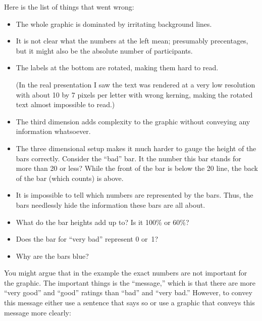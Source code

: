 Here is the list of things that went wrong:
\begin{itemize}
\item
  The whole graphic is dominated by irritating background lines.
\item
  It is not clear what the numbers at the left mean; presumably
  precentages, but it might also be the absolute number of
  participants.
\item
  The labels at the bottom are rotated, making them hard to read.

  (In the real presentation I saw the text was rendered at a very
  low resolution with about 10 by 7 pixels per letter with wrong
  kerning, making the rotated text almost impossible to read.)
\item
  The third dimension adds complexity to the graphic without conveying
  any information whatsoever.
\item
  The three dimensional setup makes it much harder to gauge the height
  of the bars correctly. Consider the ``bad'' bar. It the number this
  bar stands for more than 20 or less? While the front of the bar is
  below the 20 line, the back of the bar (which counts) is above.
\item
  It is impossible to tell which  numbers are represented by the
  bars. Thus, the bars needlessly hide the information these bars are
  all about.
\item
  What do the bar heights add up to? Is it 100\% or 60\%?
\item
  Does the bar for ``very bad'' represent 0 or~1?
\item
  Why are the bars blue?
\end{itemize}

You might argue that in the example the exact numbers are not
important for the graphic. The important things is the ``message,''
which is that there are more ``very good'' and ``good'' ratings than
``bad'' and ``very bad.'' However, to convey this message either use a
sentence that says so or use a graphic that conveys this message more
clearly:  


